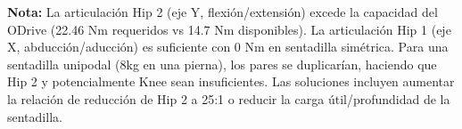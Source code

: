 \textbf{Nota:} La articulación Hip 2 (eje Y, flexión/extensión) excede la capacidad del ODrive (22.46 Nm requeridos vs 14.7 Nm disponibles). La articulación Hip 1 (eje X, abducción/aducción) es suficiente con 0 Nm en sentadilla simétrica. Para una sentadilla unipodal (8kg en una pierna), los pares se duplicarían, haciendo que Hip 2 y potencialmente Knee sean insuficientes. Las soluciones incluyen aumentar la relación de reducción de Hip 2 a 25:1 o reducir la carga útil/profundidad de la sentadilla.
